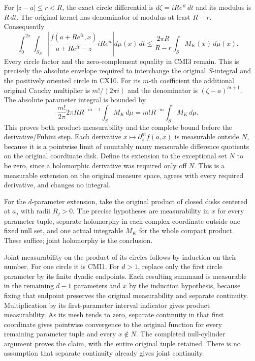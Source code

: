 \documentclass[
  11pt,
]{article}
\begin{document}
For \(|z-a|\leq r<R\), the exact circle differential is
\(d\zeta=iRe^{it}\,dt\) and its modulus is \(R\,dt\). The original
kernel has denominator of modulus at least \(R-r\). Consequently \[
\int_0^{2\pi}\int_{S_K}
\left|
\frac{f(a+Re^{it},x)}{a+Re^{it}-z}
iRe^{it}
\right|d\mu(x)\,dt
\leq
\frac{2\pi R}{R-r}\int_S M_K(x)\,d\mu(x).
\tag{CMI4}
\] Every circle factor and the zero-complement equality in CMI3 remain.
This is precisely the absolute envelope required to interchange the
original \(S\)-integral and the positively oriented circle in CX10. For
its \(m\)-th coefficient the additional original Cauchy multiplier is
\(m!/(2\pi i)\) and the denominator is \((\zeta-a)^{m+1}\). The absolute
parameter integral is bounded by \[
\frac{m!}{2\pi}2\pi R R^{-m-1}
\int_S M_K\,d\mu
=m!R^{-m}\int_S M_K\,d\mu .
\tag{CMI5}
\] This proves both product measurability and the complete bound before
the derivative/Fubini step. Each derivative
\(x\mapsto\partial_z^m f(a,x)\) is measurable outside \(N\), because it
is a pointwise limit of countably many measurable difference quotients
on the original coordinate disk. Define its extension to the exceptional
set \(N\) to be zero, since a holomorphic derivative was required only
off \(N\). This is a measurable extension on the original measure space,
agrees with every required derivative, and changes no integral.

For the \(d\)-parameter extension, take the original product of closed
disks centered at \(a_j\) with radii \(R_j>0\). The precise hypotheses
are measurability in \(x\) for every parameter tuple, separate
holomorphy in each complex coordinate outside one fixed null set, and
one actual integrable \(M_K\) for the whole compact product. These
suffice; joint holomorphy is the conclusion.

Joint measurability on the product of its circles follows by induction
on their number. For one circle it is CMI1. For \(d>1\), replace only
the first circle parameter by its finite dyadic endpoints. Each
resulting summand is measurable in the remaining \(d-1\) parameters and
\(x\) by the induction hypothesis, because fixing that endpoint
preserves the original measurability and separate continuity.
Multiplication by its first-parameter interval indicator gives product
measurability. As its mesh tends to zero, separate continuity in that
first coordinate gives pointwise convergence to the original function
for every remaining parameter tuple and every \(x\notin N\). The
completed null-cylinder argument proves the claim, with the entire
original tuple retained. There is no assumption that separate continuity
already gives joint continuity.
\end{document}
